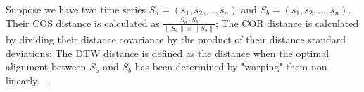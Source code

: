 Suppose we have two time series $S_a = (s_1,s_2, ... ,s_n)$ and $S_b = (s_1, s_2, ..., s_n)$.  Their COS distance is calculated as $\frac{S_{a}\cdot S_{b}}{\left \| S_{a}\right \|\times \left \| S_{b} \right \|}$;   The COR distance is calculated by dividing their distance covariance by the product of their distance standard deviations; The DTW distance is defined as the distance when the optimal alignment between $S_a$ and $S_b$ has been determined by "warping" them non-linearly.   ~\cite{dtw}.


